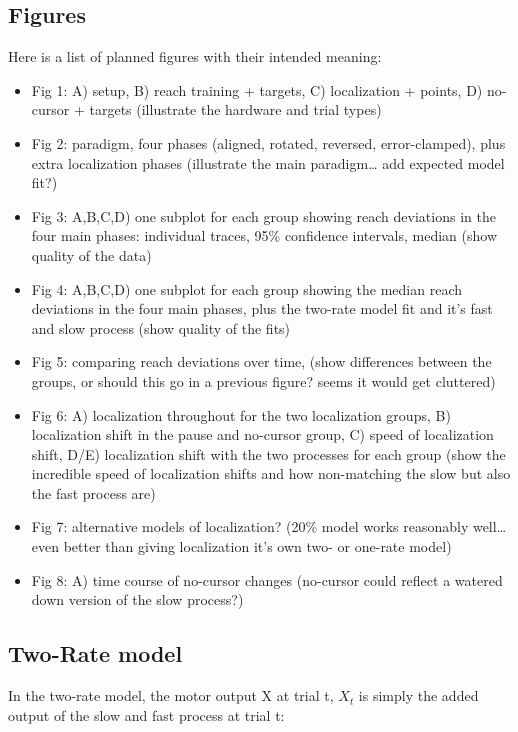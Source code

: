 \documentclass[]{article}
\providecommand{\tightlist}{%
  \setlength{\itemsep}{0pt}\setlength{\parskip}{0pt}}
\begin{document}
\subsection{Figures}\label{figures}

Here is a list of planned figures with their intended meaning:

\begin{itemize}
\tightlist
\item
  Fig 1: A) setup, B) reach training + targets, C) localization +
  points, D) no-cursor + targets (illustrate the hardware and trial
  types)
\item
  Fig 2: paradigm, four phases (aligned, rotated, reversed,
  error-clamped), plus extra localization phases (illustrate the main
  paradigm\ldots{} add expected model fit?)
\item
  Fig 3: A,B,C,D) one subplot for each group showing reach deviations in
  the four main phases: individual traces, 95\% confidence intervals,
  median (show quality of the data)
\item
  Fig 4: A,B,C,D) one subplot for each group showing the median reach
  deviations in the four main phases, plus the two-rate model fit and
  it's fast and slow process (show quality of the fits)
\item
  Fig 5: comparing reach deviations over time, (show differences between
  the groups, or should this go in a previous figure? seems it would get
  cluttered)
\item
  Fig 6: A) localization throughout for the two localization groups, B)
  localization shift in the pause and no-cursor group, C) speed of
  localization shift, D/E) localization shift with the two processes for
  each group (show the incredible speed of localization shifts and how
  non-matching the slow but also the fast process are)
\item
  Fig 7: alternative models of localization? (20\% model works
  reasonably well\ldots{} even better than giving localization it's own
  two- or one-rate model)
\item
  Fig 8: A) time course of no-cursor changes (no-cursor could reflect a
  watered down version of the slow process?)
\end{itemize}

\subsection{Two-Rate model}\label{two-rate-model}

In the two-rate model, the motor output X at trial t, \(X_t\) is simply
the added output of the slow and fast process at trial t:
\end{document}
